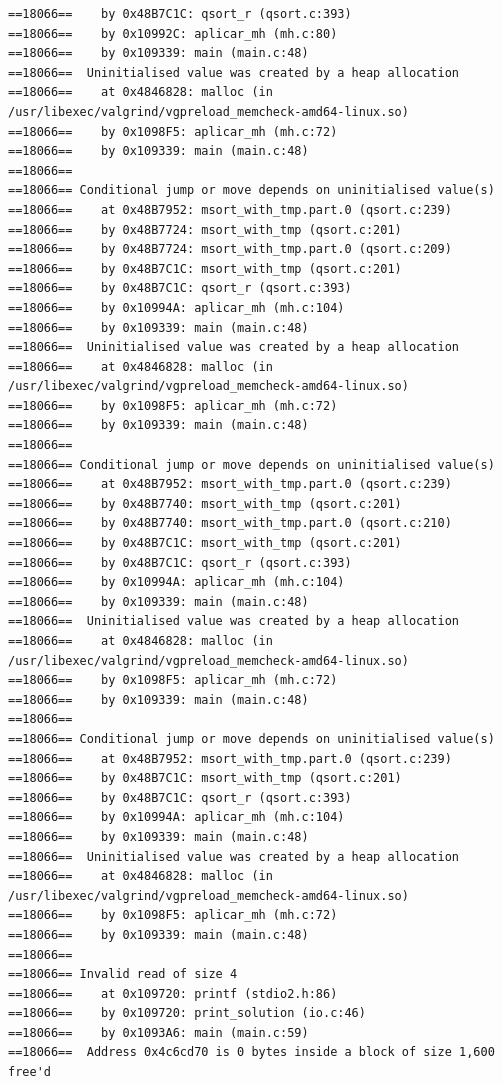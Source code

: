 \documentclass[12pt]{article}
\begin{document}
\begin{lstlisting}[style=EstiloValgrind]
==18066==    by 0x48B7C1C: qsort_r (qsort.c:393)
==18066==    by 0x10992C: aplicar_mh (mh.c:80)
==18066==    by 0x109339: main (main.c:48)
==18066==  Uninitialised value was created by a heap allocation
==18066==    at 0x4846828: malloc (in /usr/libexec/valgrind/vgpreload_memcheck-amd64-linux.so)
==18066==    by 0x1098F5: aplicar_mh (mh.c:72)
==18066==    by 0x109339: main (main.c:48)
==18066== 
==18066== Conditional jump or move depends on uninitialised value(s)
==18066==    at 0x48B7952: msort_with_tmp.part.0 (qsort.c:239)
==18066==    by 0x48B7724: msort_with_tmp (qsort.c:201)
==18066==    by 0x48B7724: msort_with_tmp.part.0 (qsort.c:209)
==18066==    by 0x48B7C1C: msort_with_tmp (qsort.c:201)
==18066==    by 0x48B7C1C: qsort_r (qsort.c:393)
==18066==    by 0x10994A: aplicar_mh (mh.c:104)
==18066==    by 0x109339: main (main.c:48)
==18066==  Uninitialised value was created by a heap allocation
==18066==    at 0x4846828: malloc (in /usr/libexec/valgrind/vgpreload_memcheck-amd64-linux.so)
==18066==    by 0x1098F5: aplicar_mh (mh.c:72)
==18066==    by 0x109339: main (main.c:48)
==18066== 
==18066== Conditional jump or move depends on uninitialised value(s)
==18066==    at 0x48B7952: msort_with_tmp.part.0 (qsort.c:239)
==18066==    by 0x48B7740: msort_with_tmp (qsort.c:201)
==18066==    by 0x48B7740: msort_with_tmp.part.0 (qsort.c:210)
==18066==    by 0x48B7C1C: msort_with_tmp (qsort.c:201)
==18066==    by 0x48B7C1C: qsort_r (qsort.c:393)
==18066==    by 0x10994A: aplicar_mh (mh.c:104)
==18066==    by 0x109339: main (main.c:48)
==18066==  Uninitialised value was created by a heap allocation
==18066==    at 0x4846828: malloc (in /usr/libexec/valgrind/vgpreload_memcheck-amd64-linux.so)
==18066==    by 0x1098F5: aplicar_mh (mh.c:72)
==18066==    by 0x109339: main (main.c:48)
==18066== 
==18066== Conditional jump or move depends on uninitialised value(s)
==18066==    at 0x48B7952: msort_with_tmp.part.0 (qsort.c:239)
==18066==    by 0x48B7C1C: msort_with_tmp (qsort.c:201)
==18066==    by 0x48B7C1C: qsort_r (qsort.c:393)
==18066==    by 0x10994A: aplicar_mh (mh.c:104)
==18066==    by 0x109339: main (main.c:48)
==18066==  Uninitialised value was created by a heap allocation
==18066==    at 0x4846828: malloc (in /usr/libexec/valgrind/vgpreload_memcheck-amd64-linux.so)
==18066==    by 0x1098F5: aplicar_mh (mh.c:72)
==18066==    by 0x109339: main (main.c:48)
==18066== 
==18066== Invalid read of size 4
==18066==    at 0x109720: printf (stdio2.h:86)
==18066==    by 0x109720: print_solution (io.c:46)
==18066==    by 0x1093A6: main (main.c:59)
==18066==  Address 0x4c6cd70 is 0 bytes inside a block of size 1,600 free'd

\end{lstlisting}
\end{document}
